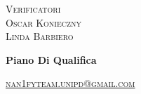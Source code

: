 \documentclass[8pt]{article}
\begin{document}
\begin{titlepage}
\begin{minipage}[t]{0.47\textwidth}
		{\large{\textsc{Verificatori}}
			\vspace{3mm}
			{\\\large{\textsc{Oscar Konieczny}\\}} 
			{\large{\textsc{Linda Barbiero}}}
			
		}
		\vspace{4mm}\vspace{4mm}
	\end{minipage}
	\vspace{4cm}
	\begin{center}
		\begin{flushright}
			{\fontsize{30pt}{52pt}\selectfont \textbf{Piano Di Qualifica}} %
		\end{flushright}
		\vspace{3cm}
	\end{center}
	\vspace{10 cm}
	{\small \textsc{\href{mailto: nan1fyteam.unipd@gmail.com}{nan1fyteam.unipd@gmail.com}}}
\end{titlepage}
\pagestyle{mystyle}
\end{document}
